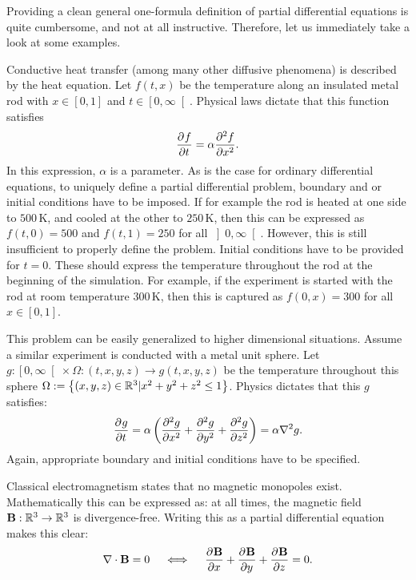 Providing a clean general one-formula definition of partial differential equations is quite cumbersome, and not at all instructive. Therefore, let us immediately take a look at some examples.

Conductive heat transfer (among many other diffusive phenomena) is described by the heat equation. Let $f(t, x)$ be the temperature along an insulated metal rod with $x \in [0, 1]$ and $t \in \left[0, \infty\right[$. Physical laws dictate that this function satisfies
$$
    {\pdv[]{f}{t}} = \alpha \pdv[2]{f}{x}\text{.}
$$
In this expression, $\alpha$ is a parameter. As is the case for ordinary differential equations, to uniquely define a partial differential problem, boundary and or initial conditions have to be imposed. If for example the rod is heated at one side to $500\,\text{K}$, and cooled at the other to $250\,\text{K}$, then this can be expressed as $f(t, 0) = 500$ and $f(t, 1)=250$ for all $\left]0, \infty\right[$. However, this is still insufficient to properly define the problem. Initial conditions have to be provided for $t=0$. These should express the temperature throughout the rod at the beginning of the simulation. For example, if the experiment is started with the rod at room temperature $300\,\text{K}$, then this is captured as $f(0, x) = 300$ for all $x \in [0, 1]$.

This problem can be easily generalized to higher dimensional situations. Assume a similar experiment is conducted with a metal unit sphere. Let $g : \left[0, \infty\right[ \times \Omega : (t, x, y, z) \to g(t, x, y, z)$ be the temperature throughout this sphere $\Omega := \left\{(x, y, z) \in \mathbb{R}^3 | x^2 + y^2 + z^2 \leq 1\right\}$. Physics dictates that this $g$ satisfies:
$$
{\pdv[]{g}{t}} = \alpha\left(\pdv[2]{g}{x} + \pdv[2]{g}{y} + \pdv[2]{g}{z}\right) = \alpha \nabla^2 g \text{.}
$$
Again, appropriate boundary and initial conditions have to be specified.

Classical electromagnetism states that no magnetic monopoles exist. Mathematically this can be expressed as: at all times, the magnetic field $\vb{B} : \mathbb{R}^3 \to \mathbb{R}^3$ is divergence-free. Writing this as a partial differential equation makes this clear:
\begin{equation}\label{equ:c1_gauss_magnets}
    \nabla \cdot \vb{B} = 0 \quad\iff\quad \pdv[]{\vb{B}}{x} + \pdv[]{\vb{B}}{y} + \pdv[]{\vb{B}}{z} = 0\text{.}    
\end{equation}

